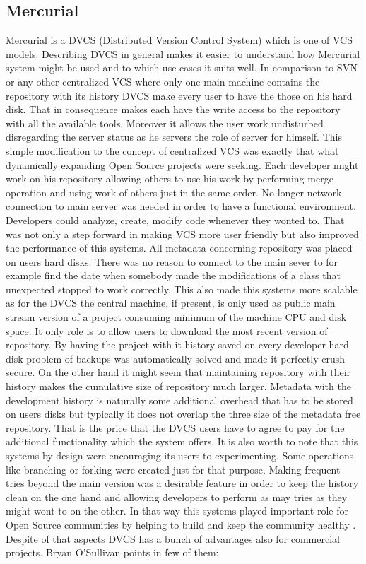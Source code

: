 \subsection{Mercurial}\label{subsec:hg}
Mercurial is a DVCS (Distributed Version Control System) which is one of VCS models. Describing DVCS in general makes it easier to understand how Mercurial system might be used and to which use cases it suits well. In comparison to SVN or any other centralized VCS where only one main machine contains the repository with its history DVCS make every user to have the those on his hard disk. That in consequence makes each have the write access to the repository with all the available tools. Moreover it allows the user work undisturbed disregarding the server status as he servers the role of server for himself. This simple modification to the concept of centralized VCS was exactly that what dynamically expanding Open Source projects were seeking. Each developer might work on his repository allowing others to use his work by performing merge operation and using work of others just in the same order. No longer network connection to main server was needed in order to have a functional environment. Developers could analyze, create, modify code whenever they wonted to. That was not only a step forward in making VCS more user friendly but also improved the performance of this systems. All metadata concerning repository was placed on users hard disks. There was no reason to connect to the main sever to for example find the date when somebody made the modifications of a class that unexpected stopped to work correctly. This also made this systems more scalable as for the DVCS the central machine, if present, is only used as public main stream version of a project consuming minimum of the machine CPU and disk space. It only role is to allow users to download the most recent version of repository. By having the project with it history saved on every developer hard disk problem of backups was automatically solved and made it perfectly crush secure. On the other hand it might seem that maintaining repository with their history makes the cumulative size of repository much larger. Metadata with the development history is naturally some additional overhead that has to be stored on users disks but typically it does not overlap the three size of the metadata free repository. That is the price that the DVCS users have to agree to pay for the additional functionality which the  system offers. It is also worth to note that this systems by design were encouraging its users to experimenting. Some operations like branching or forking were created just for that purpose. Making frequent tries beyond the main version was a desirable feature in order to keep the history clean on the one hand  and allowing developers to perform as may tries as they might wont to on the other. In that way this systems played important role for  Open Source communities by helping to build and keep the community healthy \cite{git_talk,svn_talk}. Despite of that aspects DVCS has a bunch of advantages also for commercial projects. Bryan O'Sullivan points in \cite{hg_book} few of them: 
